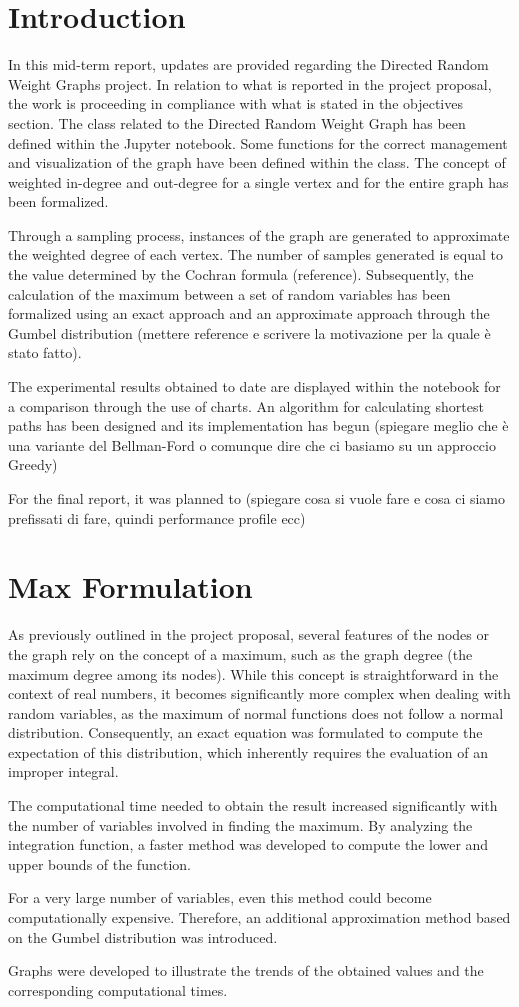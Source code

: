 \section{Introduction}
In this mid-term report, updates are provided regarding the Directed Random Weight Graphs project. In relation to what is reported in the project proposal, the work is proceeding in compliance with what is stated in the objectives section. 
The class related to the Directed Random Weight Graph has been defined within the Jupyter notebook. Some functions for the correct management and visualization of the graph have been defined within the class.
The concept of weighted in-degree and out-degree for a single vertex and for the entire graph has been formalized.

Through a sampling process, instances of the graph are generated to approximate the weighted degree of each vertex. The number of samples generated is equal to the value determined by the Cochran formula (reference).
Subsequently, the calculation of the maximum between a set of random variables has been formalized using an exact approach and an approximate approach through the Gumbel distribution (mettere reference e scrivere la motivazione per la quale è stato fatto). 

The experimental results obtained to date are displayed within the notebook for a comparison through the use of charts. 
An algorithm for calculating shortest paths has been designed and its implementation has begun (spiegare meglio che è una variante del Bellman-Ford o comunque dire che ci basiamo su un approccio Greedy) 

For the final report, it was planned to (spiegare cosa si vuole fare e cosa ci siamo prefissati di fare, quindi performance profile ecc) 

\section{Max Formulation}
As previously outlined in the project proposal, several features of the nodes or the graph rely on the concept of a maximum, such as the graph degree (the maximum degree among its nodes). While this concept is straightforward in the context of real numbers, it becomes significantly more complex when dealing with random variables, as the maximum of normal functions does not follow a normal distribution. Consequently, an exact equation was formulated to compute the expectation of this distribution, which inherently requires the evaluation of an improper integral.

The computational time needed to obtain the result increased significantly with the number of variables involved in finding the maximum. By analyzing the integration function, a faster method was developed to compute the lower and upper bounds of the function.

For a very large number of variables, even this method could become computationally expensive. Therefore, an additional approximation method based on the Gumbel distribution was introduced.

Graphs were developed to illustrate the trends of the obtained values and the corresponding computational times.
